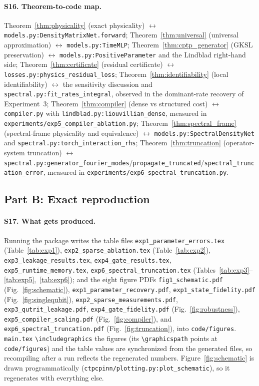 \documentclass[11pt]{article}
\begin{document}
\paragraph{S16. Theorem-to-code map.}
Theorem~\ref{thm:physicality} (exact physicality) $\leftrightarrow$ \texttt{models.py:DensityMatrixNet.forward}; Theorem~\ref{thm:universal} (universal approximation) $\leftrightarrow$ \texttt{models.py:TimeMLP}; Theorem~\ref{thm:cptp_generator} (GKSL preservation) $\leftrightarrow$ \texttt{models.py:PositiveParameter} and the Lindblad right-hand side; Theorem~\ref{thm:certificate} (residual certificate) $\leftrightarrow$ \texttt{losses.py:physics\_residual\_loss}; Theorem~\ref{thm:identifiability} (local identifiability) $\leftrightarrow$ the sensitivity discussion and \texttt{spectral.py:fit\_rates\_integral}, observed in the dominant-rate recovery of Experiment~3; Theorem~\ref{thm:compiler} (dense vs structured cost) $\leftrightarrow$ \texttt{compiler.py} with \texttt{lindblad.py:liouvillian\_dense}, measured in \texttt{experiments/exp5\_compiler\_ablation.py}; Theorem~\ref{thm:spectral_frame} (spectral-frame physicality and equivalence) $\leftrightarrow$ \texttt{models.py:SpectralDensityNet} and \texttt{spectral.py:torch\_interaction\_rhs}; Theorem~\ref{thm:truncation} (operator-system truncation) $\leftrightarrow$ \texttt{spectral.py:generator\_fourier\_modes}/\texttt{propagate\_truncated}/\texttt{spectral\_truncation\_error}, measured in \texttt{experiments/exp6\_spectral\_truncation.py}.

\subsection*{Part B: Exact reproduction}

\paragraph{S17. What gets produced.}
Running the package writes the table files \texttt{exp1\_parameter\_errors.tex} (Table~\ref{tab:exp1}), \texttt{exp2\_sparse\_ablation.tex} (Table~\ref{tab:exp2}), \texttt{exp3\_leakage\_results.tex}, \texttt{exp4\_gate\_results.tex}, \texttt{exp5\_runtime\_memory.tex}, \texttt{exp6\_spectral\_truncation.tex} (Tables~\ref{tab:exp3}--\ref{tab:exp5},~\ref{tab:exp6}); and the eight figure PDFs \texttt{fig1\_schematic.pdf} (Fig.~\ref{fig:schematic}), \texttt{exp1\_parameter\_recovery.pdf}, \texttt{exp1\_state\_fidelity.pdf} (Fig.~\ref{fig:singlequbit}), \texttt{exp2\_sparse\_measurements.pdf}, \texttt{exp3\_qutrit\_leakage.pdf}, \texttt{exp4\_gate\_fidelity.pdf} (Fig.~\ref{fig:robustness}), \texttt{exp5\_compiler\_scaling.pdf} (Fig.~\ref{fig:compiler}), and \texttt{exp6\_spectral\_truncation.pdf} (Fig.~\ref{fig:truncation}), into \texttt{code/figures}. \texttt{main.tex} \texttt{\textbackslash includegraphics} the figures (its \texttt{\textbackslash graphicspath} points at \texttt{code/figures}) and the table values are synchronized from the generated files, so recompiling after a run reflects the regenerated numbers. Figure~\ref{fig:schematic} is drawn programmatically (\texttt{ctpcpinn/plotting.py:plot\_schematic}), so it regenerates with everything else.
\end{document}
